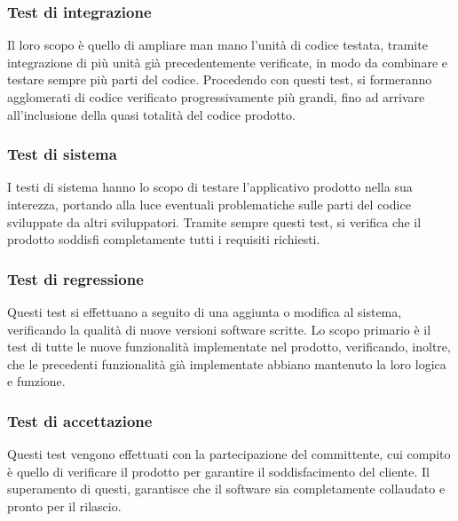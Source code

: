 \subsubsection{Test di integrazione}
Il loro scopo è quello di ampliare man mano l’unità di codice testata, tramite integrazione di più unità già precedentemente verificate, in modo da combinare e testare sempre più parti del codice. Procedendo con questi test, si formeranno agglomerati di codice verificato progressivamente più grandi, fino ad arrivare all’inclusione della quasi totalità del codice prodotto.

\subsubsection{Test di sistema}
I testi di sistema hanno lo scopo di testare l’applicativo prodotto nella sua interezza, portando alla luce eventuali problematiche sulle parti del codice sviluppate da altri sviluppatori. Tramite sempre questi test, si verifica che il prodotto soddisfi completamente tutti i requisiti richiesti.

\subsubsection{Test di regressione}
Questi test si effettuano a seguito di una aggiunta o modifica al sistema, verificando la qualità di nuove versioni software scritte. Lo scopo primario è il test di tutte le nuove funzionalità implementate nel prodotto, verificando, inoltre, che le precedenti funzionalità già implementate abbiano mantenuto la loro logica e funzione.

\subsubsection{Test di accettazione}
Questi test vengono effettuati con la partecipazione del committente, cui compito è quello di verificare il prodotto per garantire il soddisfacimento del cliente. Il superamento di questi, garantisce che il software sia completamente collaudato e pronto per il rilascio.

